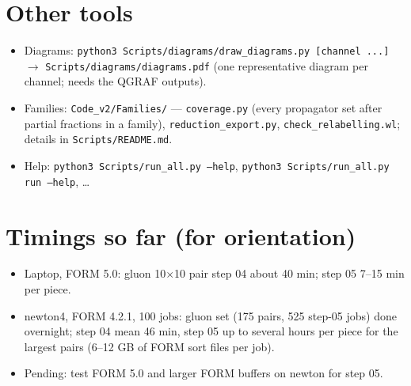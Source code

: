 \documentclass[10pt]{article}
\newcommand{\cmd}[1]{\texttt{#1}}
\begin{document}
\section{Other tools}
\begin{itemize}
\item Diagrams: \cmd{python3 Scripts/diagrams/draw\_diagrams.py [channel ...]} $\to$ \cmd{Scripts/diagrams/diagrams.pdf}
  (one representative diagram per channel; needs the QGRAF outputs).
\item Families: \cmd{Code\_v2/Families/} --- \cmd{coverage.py} (every propagator set after partial fractions in a
  family), \cmd{reduction\_export.py}, \cmd{check\_relabelling.wl}; details in \cmd{Scripts/README.md}.
\item Help: \cmd{python3 Scripts/run\_all.py --help}, \cmd{python3 Scripts/run\_all.py run --help}, \ldots
\end{itemize}

\section{Timings so far (for orientation)}
\begin{itemize}
\item Laptop, FORM 5.0: gluon 10$\times$10 pair step 04 about 40 min; step 05 7--15 min per piece.
\item newton4, FORM 4.2.1, 100 jobs: gluon set (175 pairs, 525 step-05 jobs) done overnight; step 04 mean 46 min,
  step 05 up to several hours per piece for the largest pairs (6--12 GB of FORM sort files per job).
\item Pending: test FORM 5.0 and larger FORM buffers on newton for step 05.
\end{itemize}
\end{document}
